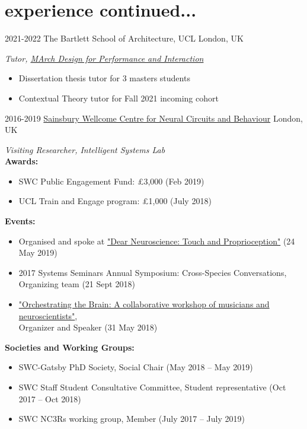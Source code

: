 \documentclass[10pt, a4]{friggeri-cv}
\begin{document}
\section{experience continued...}
\begin{entrylist}

\entry
    {2021-2022}
	{The Bartlett School of Architecture, UCL}
	{London, UK}
	{\emph{Tutor, \href{http://www.interactivearchitecture.org/}{MArch Design for Performance and Interaction}}
	\begin{itemize}
		\item Dissertation thesis tutor for 3 masters students
		\item Contextual Theory tutor for Fall 2021 incoming cohort
	\end{itemize}
	}
\entry
    {2016-2019}
    {\href{https://www.ucl.ac.uk/swc/}{Sainsbury Wellcome Centre for Neural Circuits and Behaviour}}
    {London, UK}
    {\emph{Visiting Researcher, Intelligent Systems Lab} \\
	\textbf{Awards:}
	\begin{itemize}
		\item SWC Public Engagement Fund: £3,000 (Feb 2019)
		\item UCL Train and Engage program: £1,000 (July 2018)
	\end{itemize}
	\textbf{Events:}
	\begin{itemize}
		\item Organised and spoke at \href{http://www.everymind.online/DearNeuroscience/TouchProprioception/}{"Dear Neuroscience: Touch and Proprioception"} (24 May 2019)
		\item 2017 Systems Seminars Annual Symposium: Cross-Species Conversations, Organizing team (21 Sept 2018)
		\item \href{https://www.sainsburywellcome.org/web/public-engagement/orchestrating-brain}{"Orchestrating the Brain: A collaborative workshop of musicians and neuroscientists"}, \\Organizer and Speaker (31 May 2018)
	\end{itemize}
	\textbf{Societies and Working Groups:}
	\begin{itemize}
		\item SWC-Gatsby PhD Society, Social Chair (May 2018 -- May 2019)
		\item SWC Staff Student Consultative Committee, Student representative (Oct 2017 -- Oct 2018)
		\item SWC NC3Rs working group, Member (July 2017 -- July 2019)

\end{itemize}}
\end{entrylist}
\end{document}
